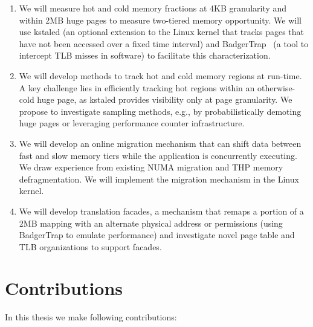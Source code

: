 \begin{enumerate}
\item
We will measure hot and cold memory fractions at 4KB granularity and within 2MB
huge pages to measure two-tiered memory opportunity. We will use kstaled (an
optional extension to the Linux kernel that tracks pages that have not been
accessed over a fixed time interval) and BadgerTrap~\cite{ref:badgertrap} (a tool to
intercept TLB misses in software) to facilitate this characterization. 

\item
We will develop methods to track hot and cold memory regions at run-time.  A
key challenge lies in efficiently tracking hot regions within an otherwise-cold
huge page, as kstaled provides visibility only at page granularity.  We propose
to investigate sampling methods, e.g., by probabilistically demoting huge pages
or leveraging performance counter infrastructure. 

\item
We will develop an online migration mechanism that can shift data between
fast and slow memory tiers while the application is concurrently executing.  We
draw experience from existing NUMA migration and THP memory defragmentation. We
will implement the migration mechanism in the Linux kernel.

\item
We will develop translation facades, a mechanism that remaps a
portion of a 2MB mapping with an alternate physical address or permissions
(using BadgerTrap to emulate performance) and investigate novel page table and
TLB organizations to support facades.
\end{enumerate}

\section{Contributions}
In this thesis we make following contributions:

